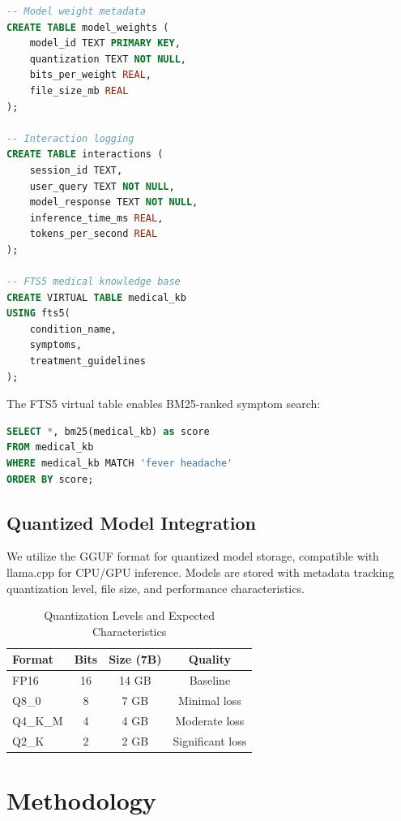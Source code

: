 \documentclass[conference]{IEEEtran}
\begin{document}
\begin{lstlisting}[language=SQL, basicstyle=\footnotesize\ttfamily, caption={Core Database Schema}]
-- Model weight metadata
CREATE TABLE model_weights (
    model_id TEXT PRIMARY KEY,
    quantization TEXT NOT NULL,
    bits_per_weight REAL,
    file_size_mb REAL
);

-- Interaction logging
CREATE TABLE interactions (
    session_id TEXT,
    user_query TEXT NOT NULL,
    model_response TEXT NOT NULL,
    inference_time_ms REAL,
    tokens_per_second REAL
);

-- FTS5 medical knowledge base
CREATE VIRTUAL TABLE medical_kb 
USING fts5(
    condition_name,
    symptoms,
    treatment_guidelines
);
\end{lstlisting}

The FTS5 virtual table enables BM25-ranked symptom search:
\begin{lstlisting}[language=SQL, basicstyle=\footnotesize\ttfamily]
SELECT *, bm25(medical_kb) as score
FROM medical_kb
WHERE medical_kb MATCH 'fever headache'
ORDER BY score;
\end{lstlisting}

\subsection{Quantized Model Integration}

We utilize the GGUF format for quantized model storage, compatible with llama.cpp for CPU/GPU inference. Models are stored with metadata tracking quantization level, file size, and performance characteristics.

\begin{table}[htbp]
\caption{Quantization Levels and Expected Characteristics}
\begin{center}
\begin{tabular}{lccc}
\toprule
\textbf{Format} & \textbf{Bits} & \textbf{Size (7B)} & \textbf{Quality} \\
\midrule
FP16 & 16 & 14 GB & Baseline \\
Q8\_0 & 8 & 7 GB & Minimal loss \\
Q4\_K\_M & 4 & 4 GB & Moderate loss \\
Q2\_K & 2 & 2 GB & Significant loss \\
\bottomrule
\end{tabular}
\end{center}
\end{table}

\section{Methodology}
\end{document}
